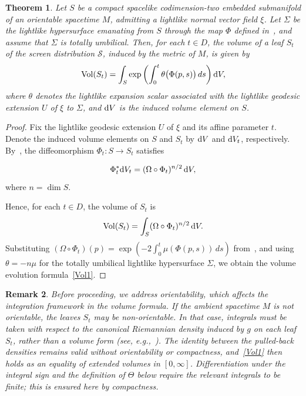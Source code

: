 \documentclass[11pt]{article}
\numberwithin{equation}{section}
\newtheorem{theorem}{Theorem}[section]
\newtheorem{remark}[theorem]{Remark}
\begin{document}
\begin{theorem}\label{Th:Vol1}
	Let \(S\) be a compact spacelike codimension-two embedded submanifold of an orientable spacetime \(M\), admitting a lightlike normal vector field \(\xi\). Let \(\Sigma\) be the lightlike hypersurface emanating from \(S\) through the map \(\Phi\) defined in~, and assume that \(\Sigma\) is totally umbilical. Then, for each \(t \in D\), the volume of a leaf \(S_t\) of the screen distribution \(\mathcal{S}\), induced by the metric of \(M\), is given by
	\begin{equation}\label{Vol1}
		\operatorname{Vol}(S_t) = \int_S \exp\left( \int_0^t \theta\bigl(\Phi(p, s)\bigr) \, ds \right) {\rm d}V,
	\end{equation}
	where \(\theta\) denotes the lightlike expansion scalar associated with the lightlike geodesic extension \(U\) of \(\xi\) to \(\Sigma\), and \({\rm d}V\) is the induced volume element on \(S\).
\end{theorem}
\begin{proof}
	Fix the lightlike geodesic extension \(U\) of \(\xi\) and its affine parameter \(t\). Denote the induced volume elements on \(S\) and \(S_t\) by \({\rm d}V\) and \({\rm d}V_t\), respectively. By~, the diffeomorphism \(\Phi_t\colon S\to S_t\) satisfies
	
	\[
	\Phi_t^* {\rm d}V_t = (\Omega \circ \Phi_t)^{n/2} \, {\rm d}V,
	\]
	where \(n = \dim S\).
	
	Hence, for each \(t \in D\), the volume of \(S_t\) is
	\[
	\operatorname{Vol}(S_t) = \int_S (\Omega \circ \Phi_t)^{n/2} \, {\rm d}V.
	\]
	Substituting \((\Omega \circ \Phi_t)(p) = \exp\left(-2 \int_0^t \mu(\Phi(p, s)) \, ds\right)\) from~, and using \(\theta = -n \mu\) for the totally umbilical lightlike hypersurface \(\Sigma\), we obtain the volume evolution formula~\eqref{Vol1}.
\end{proof}

\begin{remark}\normalfont
	Before proceeding, we address orientability, which affects the integration framework in the volume formula. If the ambient spacetime \(M\) is not orientable, the leaves \(S_t\) may be non-orientable. In that case, integrals must be taken with respect to the canonical Riemannian density induced by \(g\) on each leaf \(S_t\), rather than a volume form (see, e.g.,~\cite[Prop.~16.45]{lee2}). The identity between the pulled-back densities remains valid without orientability or compactness, and~\eqref{Vol1} then holds as an equality of extended volumes in $[0,\infty]$. Differentiation under the integral sign and the definition of $\Theta$ below require the relevant integrals to be finite; this is ensured here by compactness.
\end{remark}
\end{document}
